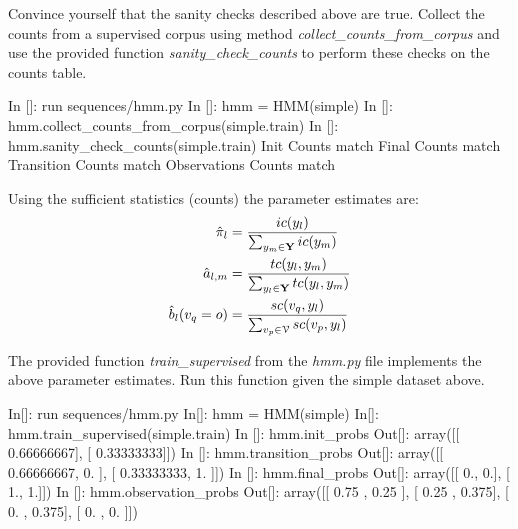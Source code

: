 \begin{exercise}
Convince yourself that the sanity checks described above are true. Collect the counts from a supervised corpus using method
\emph{collect\_counts\_from\_corpus} and use the provided function \emph{sanity\_check\_counts} to perform these checks on the counts table. 

\begin{python}
In []: run sequences/hmm.py
In []: hmm = HMM(simple)
In []: hmm.collect_counts_from_corpus(simple.train)
In []: hmm.sanity_check_counts(simple.train)
Init Counts match
Final Counts match
Transition Counts match
Observations Counts match
\end{python}
\end{exercise}


Using the sufficient statistics (counts) the parameter estimates are: 
\begin{align}
  \hat{\pi}_l &=  \frac{ic({y}_l)}{\sum_{{y}_m \in \mathbf{Y}}
    ic({y}_m)}\\
  \hat{a}_{l,m} &= \frac{tc({y}_l,{y}_m)}{\sum_{{y}_l \in \mathbf{Y}} tc({y}_l,{y}_m)} \\
  \hat{b}_l({v}_q = o) &= \frac{sc({v}_q,{y}_l)}{\sum_{{v}_p \in\mathcal{V}} sc({v}_p,{y}_l)}
\end{align}


\begin{exercise}
The provided function \emph{train\_supervised} from the \emph{hmm.py} file implements the above parameter estimates.
Run this function given the simple dataset above.
\begin{python}
In[]:  run sequences/hmm.py
In[]: hmm = HMM(simple)
In[]: hmm.train_supervised(simple.train)
In []: hmm.init_probs
Out[]: 
array([[ 0.66666667],
       [ 0.33333333]])
In []: hmm.transition_probs
Out[]: 
array([[ 0.66666667,  0.        ],
       [ 0.33333333,  1.        ]])
In []: hmm.final_probs
Out[]: 
array([[ 0.,  0.],
       [ 1.,  1.]])
In []: hmm.observation_probs
Out[]: 
array([[ 0.75 ,  0.25 ],
       [ 0.25 ,  0.375],
       [ 0.   ,  0.375],
       [ 0.   ,  0.   ]])
\end{python}
\end{exercise}


